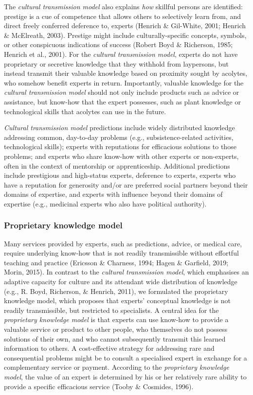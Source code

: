 \documentclass[
  11pt,
]{article}
\begin{document}
The \emph{cultural transmission model} also explains \emph{how} skillful persons are identified: prestige is a cue of competence that allows others to selectively learn from, and direct freely conferred deference to, experts (Henrich \& Gil-White, 2001; Henrich \& McElreath, 2003). Prestige might include culturally-specific concepts, symbols, or other conspicuous indications of success (Robert Boyd \& Richerson, 1985; Henrich et al., 2001). For the \emph{cultural transmission model}, experts do not have proprietary or secretive knowledge that they withhold from laypersons, but instead transmit their valuable knowledge based on proximity sought by acolytes, who somehow benefit experts in return. Importantly, valuable knowledge for the \emph{cultural transmission model} should not only include products such as advice or assistance, but know-how that the expert possesses, such as plant knowledge or technological skills that acolytes can use in the future.

\emph{Cultural transmission model} predictions include widely distributed knowledge addressing common, day-to-day problems (e.g., subsistence-related activities, technological skills); experts with reputations for efficacious solutions to those problems; and experts who share know-how with other experts or non-experts, often in the context of mentorship or apprenticeship. Additional predictions include prestigious and high-status experts, deference to experts, experts who have a reputation for generosity and/or are preferred social partners beyond their domains of expertise, and experts with influence beyond their domains of expertise (e.g., medicinal experts who also have political authority).

\hypertarget{proprietary-knowledge-model}{%
\subsubsection{Proprietary knowledge model}\label{proprietary-knowledge-model}}

Many services provided by experts, such as predictions, advice, or medical care, require underlying know-how that is not readily transmissible without effortful teaching and practice (Ericsson \& Charness, 1994; Hagen \& Garfield, 2019; Morin, 2015). In contrast to the \emph{cultural transmission model}, which emphasises an adaptive capacity for culture and its attendant wide distribution of knowledge (e.g., R. Boyd, Richerson, \& Henrich, 2011), we formulated the proprietary knowledge model, which proposes that experts' conceptual knowledge is not readily transmissible, but restricted to specialists. A central idea for the \emph{proprietary knowledge model} is that experts can use know-how to provide a valuable service or product to other people, who themselves do not possess solutions of their own, and who cannot subsequently transmit this learned information to others. A cost-effective strategy for addressing rare and consequential problems might be to consult a specialised expert in exchange for a complementary service or payment. According to the \emph{proprietary knowledge model}, the value of an expert is determined by his or her relatively rare ability to provide a specific efficacious service (Tooby \& Cosmides, 1996).
\end{document}
